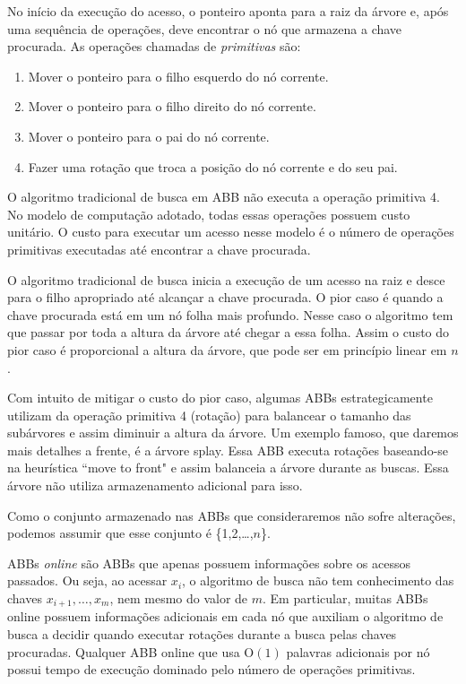 No início da execução do acesso, o ponteiro aponta para a raiz da árvore e, após uma sequência de operações, deve encontrar o nó que armazena a chave procurada. As operações chamadas de \textit{primitivas} são:
\begin{enumerate}
    \item Mover o ponteiro para o filho esquerdo do nó corrente.
    \item Mover o ponteiro para o filho direito do nó corrente.
    \item Mover o ponteiro para o pai do nó corrente.
    \item Fazer uma rotação que troca a posição do nó corrente e do seu pai.
\end{enumerate}

O algoritmo tradicional de busca em ABB não executa a operação primitiva 4. No modelo de computação adotado, todas essas operações possuem custo unitário. O custo para executar um acesso nesse modelo é o número de operações primitivas executadas até encontrar a chave procurada.

O algoritmo tradicional de busca inicia a execução de um acesso na raiz e desce para o filho apropriado até alcançar a chave procurada. O pior caso é quando a chave procurada está em um nó folha mais profundo. Nesse caso o algoritmo tem que passar por toda a altura da árvore até chegar a essa folha. Assim o custo do pior caso é proporcional a altura da árvore, que pode ser em princípio linear em $n$. 

Com intuito de mitigar o custo do pior caso, algumas ABBs estrategicamente utilizam da operação primitiva 4 (rotação) para balancear o tamanho das subárvores e assim diminuir a altura da árvore. Um exemplo famoso, que daremos mais detalhes a frente, é a árvore splay. Essa ABB executa rotações baseando-se na heurística ``move to front" e assim balanceia a árvore durante as buscas. Essa árvore não utiliza armazenamento adicional para isso.

Como o conjunto armazenado nas ABBs que consideraremos não sofre alterações, podemos assumir que esse conjunto é \{1,2,\ldots,$n$\}.

ABBs \textit{online} são ABBs que apenas possuem informações sobre os acessos passados. Ou seja, ao acessar $x_{i}$, o algoritmo de busca não tem conhecimento das chaves $x_{i+1},\ldots,x_{m}$, nem mesmo do valor de $m$. Em particular, muitas ABBs online possuem informações adicionais em cada nó que auxiliam o algoritmo de busca a decidir quando executar rotações durante a busca pelas chaves procuradas. Qualquer ABB online que usa O$(1)$ palavras adicionais por nó possui tempo de execução dominado pelo número de operações primitivas.

